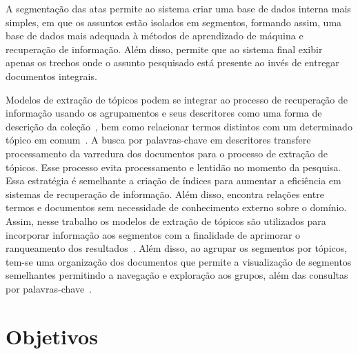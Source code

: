 
A segmentação das atas permite ao sistema criar uma base de dados interna mais simples, em que os assuntos estão isolados em segmentos, formando assim, uma base de dados mais adequada à métodos de aprendizado de máquina e recuperação de informação. Além disso, permite que ao sistema final exibir apenas os trechos onde o assunto pesquisado está presente ao invés de entregar documentos integrais.
%


Modelos de extração de tópicos podem se integrar ao processo de recuperação de informação usando os agrupamentos e seus descritores como uma forma de descrição da coleção~\cite{Zhai2017, Xing2009}, bem como relacionar termos distintos com um determinado tópico em comum~\cite{Wei2007}.  
A busca por palavras-chave em descritores transfere processamento da varredura dos documentos para o processo de extração de tópicos. Esse processo evita processamento e lentidão no momento da pesquisa. Essa estratégia é semelhante a criação de índices para aumentar a eficiência em sistemas de recuperação de informação. Além disso, encontra relações entre termos e documentos sem necessidade de conhecimento externo sobre o domínio.
%
Assim, nesse trabalho os modelos de extração de tópicos são utilizados para incorporar informação aos segmentos com a finalidade de aprimorar o ranqueamento dos resultados~\cite{Wei2007}. 
% 
Além disso, ao agrupar os segmentos por tópicos, tem-se uma organização dos documentos que permite a visualização de segmentos semelhantes permitindo a navegação e exploração aos grupos, além das consultas por palavras-chave~\cite{Maracini2010}.
%













\section{Objetivos}

